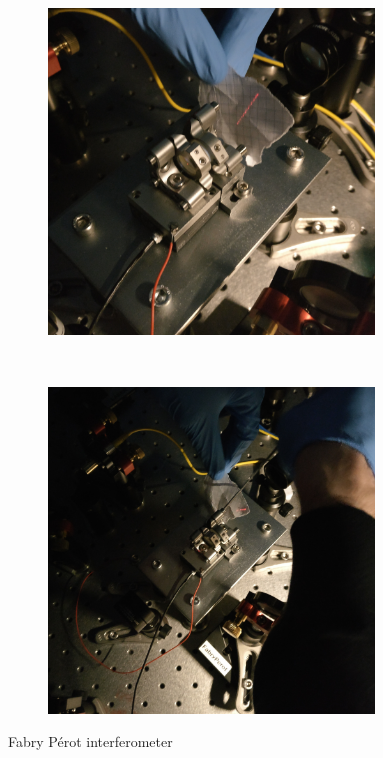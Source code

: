 \begin{figure}[H]
	\centering
	\begin{subfigure}[b]{0.48\textwidth}
		\centering
		\includegraphics[width=0.95\textwidth]{figures/fabry-perot/setup/confocal-setup-higher-modes-1}
		\caption{}
		\label{fig:confocal-setup-higher-modes-1}
	\end{subfigure}%
	~ %
	\begin{subfigure}[b]{0.48\textwidth}
		\centering
		\includegraphics[width=0.95\textwidth]{figures/fabry-perot/setup/confocal-setup-higher-modes-2}
		\caption{}
		\label{fig:confocal-setup-higher-modes-2}
	\end{subfigure}
	\caption{Fabry Pérot interferometer}
\end{figure}


